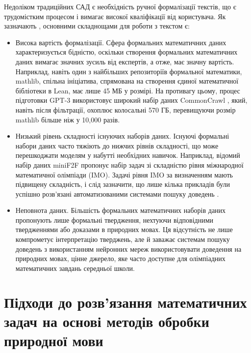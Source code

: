 Недоліком традиційних САД є необхідність ручної формалізації текстів, що є трудомістким процесом і вимагає високої кваліфікації від користувача. Як зазначають \cite{liu2023fimochallengeformaldataset}, основними складнощами для роботи з текстом є:

\begin{itemize}
    \item {Висока вартість формалізації.} Сфера формальних математичних даних характеризується бідністю, оскільки створення формальних математичних даних вимагає значних зусиль від експертів, а отже, має значну вартість. Наприклад, навіть один з найбільших репозиторіїв формальної математики, mathlib, спільна ініціатива, спрямована на створення єдиної математичної бібліотеки в Lean, має лише 45 МБ у розмірі. На противагу цьому, процес підготовки GPT-3 використовує широкий набір даних CommonCrawl \cite{brown2020languagemodelsfewshotlearners}, який, навіть після фільтрації, охоплює колосальні 570 ГБ, перевищуючи розмір mathlib більше ніж у 10,000 разів.
    
    \item {Низький рівень складності існуючих наборів даних.} Існуючі формальні набори даних часто тяжіють до нижчих рівнів складності, що може перешкоджати моделям у набутті необхідних навичок. Наприклад, відомий набір даних miniF2F пропонує набір задач зі складністю рівня міжнародної математичної олімпіади (IMO). Задачі рівня IMO за визначенням мають підвищену складність, і слід зазначити, що лише кілька прикладів були успішно розв'язані автоматизованими системами пошуку доведень \cite{polu2020generativelanguagemodelingautomated, zheng2022minif2fcrosssystembenchmarkformal, han2022proofartifactcotrainingtheorem, wang-etal-2023-dt}.
    
    \item {Неповнота даних.} Більшість формальних математичних наборів даних пропонують лише формальні твердження, нехтуючи відповідними твердженнями або доказами в природних мовах. Ця відсутність не лише компрометує інтерпретацію тверджень, але й заважає системам пошуку доведень з використанням нейронних мереж використовувати доведення на природних мовах, цінне джерело, яке часто доступне для олімпіадних математичних завдань середньої школи.
\end{itemize}



\section{Підходи до розв'язання математичних задач на основі методів обробки природної мови}

